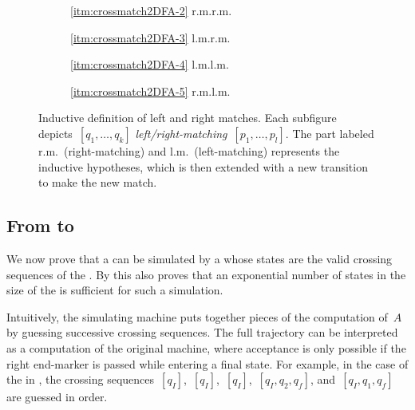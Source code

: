 \begin{figure}
	\centering
	\begin{subfigure}{0.246\textwidth}
		\centering
		
		\caption*{\ref{itm:crossmatch2DFA-2} r.m.\tto r.m.}
	\end{subfigure}
	\hfill
	\begin{subfigure}{0.242\textwidth}
		\centering
		
		\caption*{\ref{itm:crossmatch2DFA-3} l.m.\tto r.m.}
	\end{subfigure}
	\hfill
	\begin{subfigure}{0.242\textwidth}
		\centering
		
		\caption*{\ref{itm:crossmatch2DFA-4} l.m.\tto l.m.}
	\end{subfigure}
	\hfill
	\begin{subfigure}{0.246\textwidth}
		\centering
		
		\caption*{\ref{itm:crossmatch2DFA-5} r.m.\tto l.m.}
	\end{subfigure}
	\caption[The rules in the definition of matching crossing sequences.]{Inductive definition of left and right matches. Each subfigure depicts~$[q_1,\dots,q_k]$ \emph{left/right-matching}~$[p_1,\dots,p_l]$. The part labeled r.m.\ (right-matching) and l.m.\ (left-matching) represents the inductive hypotheses, which is then extended with a new transition to make the new match.}
	\label{fig:2DFA-crossmatch}
\end{figure}


\subsection{From \texorpdfstring{\TDFAs}{2DFAs} to \texorpdfstring{\ONFAs}{1NFAs}}
We now prove that a \TDFA can be simulated by a \ONFA whose states are the valid crossing sequences of the \TDFA.
By  this also proves that an exponential number of states in the size of the \TDFA is sufficient for such a simulation.

Intuitively, the simulating machine puts together pieces of the computation of~$A$ by guessing successive crossing sequences.
The full trajectory can be interpreted as a computation of the original machine, where acceptance is only possible if the right end-marker is passed while entering a final state.
For example, in the case of the \TDFA in , the crossing sequences~$[q_I]$,~$[q_I]$,~$[q_I]$,~$[q_I,q_2,q_f]$, and~$[q_I,q_1,q_f]$ are guessed in order.


